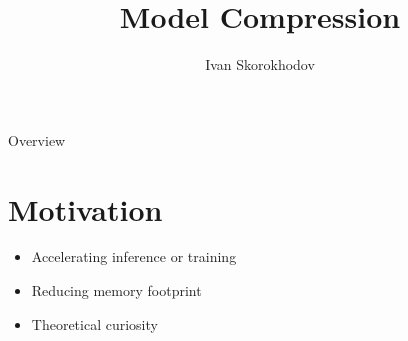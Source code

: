 \documentclass[10pt, handout]{beamer}
\title{Model Compression}
\author{Ivan Skorokhodov}
\begin{document}
\begin{frame}
    \titlepage
\end{frame}

\begin{frame}{Overview}
    \tableofcontents
\end{frame}

\section{Motivation}
\begin{frame}
    \begin{itemize}
        \item\pause Accelerating inference or training
        \item\pause Reducing memory footprint
        \item\pause Theoretical curiosity
    \end{itemize}
\end{frame}
\end{document}
